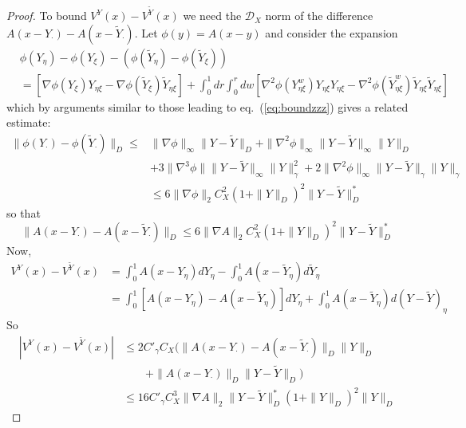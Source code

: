 \documentclass[a4paper,12pt,reqno]{amsart}
\newcommand{\wt}{\widetilde}
\newcommand{\norm}[1]{\|#1\|}
\newcommand{\DX}{\mathscr{D}_{X}}
\begin{document}
\begin{proof}
To bound $V^Y(x)-V^{\wt Y}(x)$ we need the $\DX$ norm of the
difference $A(x-Y_\cdot)-A(x-\wt Y_\cdot)$. Let $\phi(y) = A(x-y)$
and consider the expansion
\begin{equation*}
  \begin{split}
  & \phi(Y_\eta) - \phi(Y_\xi)  - (\phi(\wt Y_\eta) - \phi(\wt Y_\xi))
\\ & =\left[ \nabla\phi(Y_{\xi})
  Y_{\eta\xi}-\nabla\phi(\wt Y_{\xi}) \wt Y_{\eta\xi}\right]
+ \int_0^1 dr\int_0^r dw \left[ \nabla^2\phi(Y_{\eta\xi}^w)
  Y_{\eta\xi} Y_{\eta\xi}-\nabla^2\phi(\wt Y_{\eta\xi}^w) \wt Y_{\eta\xi}\wt Y_{\eta\xi}\right]
  \end{split}
\end{equation*}
which by arguments similar to those leading to eq.~(\ref{eq:boundzzz})
gives a related estimate:
\begin{equation*}
  \begin{split}
 \norm{\phi(Y_\cdot)-\phi(\wt Y_\cdot)}_D \le &
\norm{\nabla \phi}_\infty \norm{Y-\wt Y}_D + \norm{\nabla^2
  \phi}_\infty \norm{Y-\wt Y}_\infty \norm{Y}_D
\\
& + 3 \norm{\nabla^3 \phi} \norm{Y-\wt Y}_\infty \norm{Y}^2_\gamma + 2
\norm{\nabla^2 \phi}_\infty  \norm{Y-\wt Y}_\gamma \norm{ Y}_\gamma
\\ & \le 6 \norm{\nabla \phi}_2 C_X^2 (1+\norm{Y}_D)^2\norm{Y-\wt Y}_D^*
  \end{split}
\end{equation*}
so that
\begin{equation*}
\norm{A(x-Y_\cdot)-A(x-\wt Y_\cdot)}_D \le 6
\norm{\nabla A}_2 C_X^2 (1+\norm{Y}_D)^2\norm{Y-\wt Y}_D^*
\end{equation*}
Now,
\begin{equation*}
  \begin{split}
V^Y(x)-V^{\wt Y}(x) & = \int_0^1 A(x-Y_\eta) dY_\eta- \int_0^1 A(x-\wt
 Y_\eta) d\wt Y_\eta
\\ & =\int_0^1 [A(x-Y_\eta)-A(x-\wt Y_\eta)]dY_\eta + \int_0^1 A(x-\wt
 Y_\eta) d(Y-\wt Y)_\eta
  \end{split}
\end{equation*}
So
\begin{equation*}
  \begin{split}
|V^Y(x)-V^{\wt Y}(x)| & \le 2 C'_\gamma C_X
(\norm{A(x-Y_\cdot)-A(x-\wt Y_\cdot)}_D\norm{Y}_D
\\ & \qquad +\norm{A(x-Y_\cdot)}_D \norm{Y-\wt
 Y}_D)
\\ & \le  16 C'_\gamma C_X^3 \norm{\nabla A}_2 \norm{Y-\wt Y}_D^*
  (1+\norm{Y}_D)^2 \norm{Y}_D
  \end{split}
\end{equation*}


\end{proof}
\end{document}

